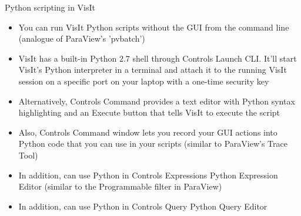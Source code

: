 

\begin{frame}{Python scripting in VisIt}{}
  \footnotesize{
    \begin{itemize}\setlength{\itemsep}{3mm}
    \item You can run VisIt Python scripts without the GUI from the command line (analogue of ParaView's
      'pvbatch')\guiless
    \item VisIt has a built-in Python 2.7 shell through Controls \ra Launch CLI. It'll start VisIt's
      Python interpreter in a terminal and attach it to the running VisIt session on a specific port on
      your laptop with a one-time security key
    \item Alternatively, Controls \ra Command provides a text editor with Python syntax highlighting and an
      Execute button that tells VisIt to execute the script
    \item Also, Controls \ra Command window lets you record your GUI actions into Python code that you can
      use in your scripts (similar to ParaView's Trace Tool)
    \item In addition, can use Python in Controls \ra Expressions \ra Python Expression Editor (similar to
      the Programmable filter in ParaView)
    \item In addition, can use Python in Controls \ra Query \ra Python Query Editor
    \end{itemize}}
\end{frame}


